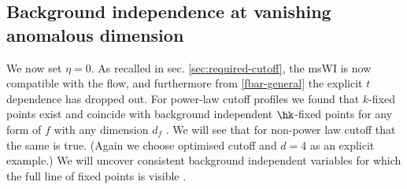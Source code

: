 \documentclass[11pt]{book} %
\begin{document}
\subsection{Background independence at vanishing anomalous dimension}\label{sec:works}
We now set $\eta=0$. As recalled in sec. \ref{sec:required-cutoff}, the msWI is now compatible with the flow, and furthermore  from \eqref{fbar-general} the explicit $t$ dependence has dropped out.
For power-law cutoff profiles we found that $k$-fixed points exist and coincide with background independent $\hk$-fixed points for any form of $f$ with any dimension $d_f$ \cite{Dietz:2015owa}. We will see that for non-power law cutoff that the same is true. (Again we choose optimised cutoff and $d=4$ as an explicit example.) We will uncover consistent background independent variables for which the full line of fixed points is visible \cite{Dietz2016}. 
\end{document}
